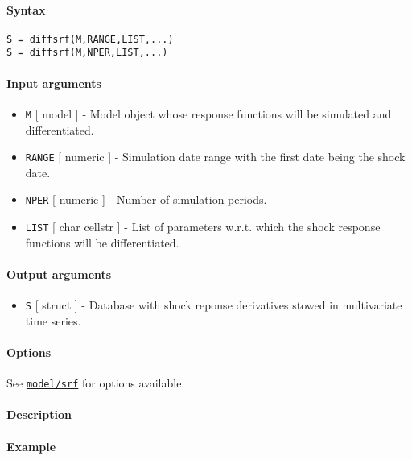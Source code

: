 


	\paragraph{Syntax}

\begin{verbatim}
S = diffsrf(M,RANGE,LIST,...)
S = diffsrf(M,NPER,LIST,...)
\end{verbatim}

\paragraph{Input arguments}

\begin{itemize}
\item
  \texttt{M} {[} model {]} - Model object whose response functions will
  be simulated and differentiated.
\item
  \texttt{RANGE} {[} numeric {]} - Simulation date range with the first
  date being the shock date.
\item
  \texttt{NPER} {[} numeric {]} - Number of simulation periods.
\item
  \texttt{LIST} {[} char \textbar{} cellstr {]} - List of parameters
  w.r.t. which the shock response functions will be differentiated.
\end{itemize}

\paragraph{Output arguments}

\begin{itemize}
\itemsep1pt\parskip0pt
\item
  \texttt{S} {[} struct {]} - Database with shock reponse derivatives
  stowed in multivariate time series.
\end{itemize}

\paragraph{Options}

See \href{model/srf}{\texttt{model/srf}} for options available.

\paragraph{Description}

\paragraph{Example}


